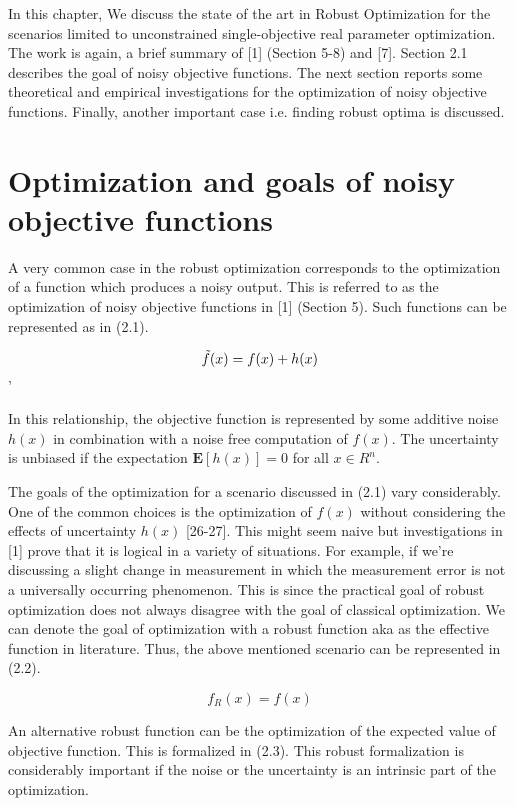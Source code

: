 
In this chapter, We discuss the state of the art in Robust Optimization for the scenarios limited to unconstrained single-objective real parameter optimization. The work is again, a brief summary of [1] (Section 5-8) and [7]. Section 2.1 describes the goal of noisy objective functions. The next section reports some theoretical and empirical investigations for the optimization of noisy objective functions. Finally, another important case i.e. finding robust optima is discussed.   

\section {Optimization and goals of noisy objective functions}

A very common case in the robust optimization corresponds to the optimization of a function which produces a noisy output. This is referred to as the optimization of noisy objective functions in [1] (Section 5). Such functions can be represented as in  (2.1).

\begin{equation}
\Tilde{f}(x) = {f}(x)+h(x) 
\end{equation} '

In this relationship, the objective function is represented by some additive noise $ h(x) $ in combination with a noise free computation of $ f(x) $. The uncertainty is unbiased if the expectation $ \textbf{E}[h(x)] = 0 $ for all $ x \in R^n$.

The goals of the optimization for a scenario discussed in (2.1) vary considerably. One of the common choices is the optimization of $f(x)$ without considering the effects of uncertainty  $ h(x) $ [26-27]. This might seem naive but investigations in [1] prove that it is logical in a variety of situations. For example, if we're discussing a slight change in measurement in which the measurement error is not a universally occurring phenomenon. This is since the practical goal of robust optimization does not always disagree with the goal of classical optimization. We can denote the goal of optimization with a robust function aka as the effective function in literature. Thus, the above mentioned scenario can be represented in (2.2). 

\begin{equation}
f_{R}(x) = {f}(x) 
\end{equation} 

An alternative robust function can be the optimization of the expected value of objective function. This is formalized in (2.3). This robust formalization is considerably important if the noise or the uncertainty is an intrinsic part of the optimization. 


